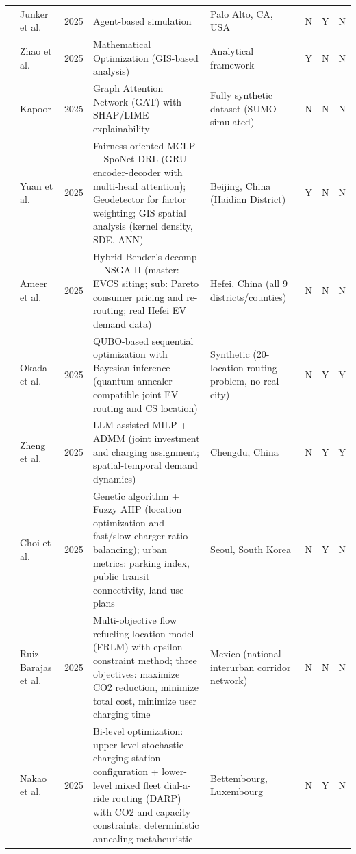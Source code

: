 \documentclass[letterpaper, 12pt, oneside, doublespacing]{Thesis}
\begin{document}
\begin{longtable}{L{0.9cm} L{1.8cm} L{0.7cm} L{2.5cm} L{2.1cm} L{0.7cm} L{0.7cm} L{0.7cm}}
\cite{data-driven_optimization_2025} & Junker et al. & 2025 & Agent-based simulation & Palo Alto, CA, USA & N & Y & N \\
\cite{electric_vehicle_2025} & Zhao et al. & 2025 & Mathematical Optimization (GIS-based analysis) & Analytical framework & Y & N & N \\
\cite{explainable_and_2025} & Kapoor & 2025 & Graph Attention Network (GAT) with SHAP/LIME explainability & Fully synthetic dataset (SUMO-simulated) & N & N & N \\
\cite{fairness-oriented_charging_2025} & Yuan et al. & 2025 & Fairness-oriented MCLP + SpoNet DRL (GRU encoder-decoder with multi-head attention); Geodetector for factor weighting; GIS spatial analysis (kernel density, SDE, ANN) & Beijing, China (Haidian District) & Y & N & N \\
\cite{hybrid_optimization_2025} & Ameer et al. & 2025 & Hybrid Bender's decomp + NSGA-II (master: EVCS siting; sub: Pareto consumer pricing and re-routing; real Hefei EV demand data) & Hefei, China (all 9 districts{\slash}counties) & N & N & N \\
\cite{joint_optimization_2025} & Okada et al. & 2025 & QUBO-based sequential optimization with Bayesian inference (quantum annealer-compatible joint EV routing and CS location) & Synthetic (20-location routing problem, no real city) & N & Y & Y \\
\cite{large_language_2025} & Zheng et al. & 2025 & LLM-assisted MILP + ADMM (joint investment and charging assignment; spatial-temporal demand dynamics) & Chengdu, China & N & Y & Y \\
\cite{location_and_2025} & Choi et al. & 2025 & Genetic algorithm + Fuzzy AHP (location optimization and fast/slow charger ratio balancing); urban metrics: parking index, public transit connectivity, land use plans & Seoul, South Korea & N & Y & N \\
\cite{multiobjective_model_2025} & Ruiz-Barajas et al. & 2025 & Multi-objective flow refueling location model (FRLM) with epsilon constraint method; three objectives: maximize CO2 reduction, minimize total cost, minimize user charging time & Mexico (national interurban corridor network) & N & N & N \\
\cite{optimal_mixed_2025} & Nakao et al. & 2025 & Bi-level optimization: upper-level stochastic charging station configuration + lower-level mixed fleet dial-a-ride routing (DARP) with CO2 and capacity constraints; deterministic annealing metaheuristic & Bettembourg, Luxembourg & N & Y & N \\

\end{longtable}
\end{document}
